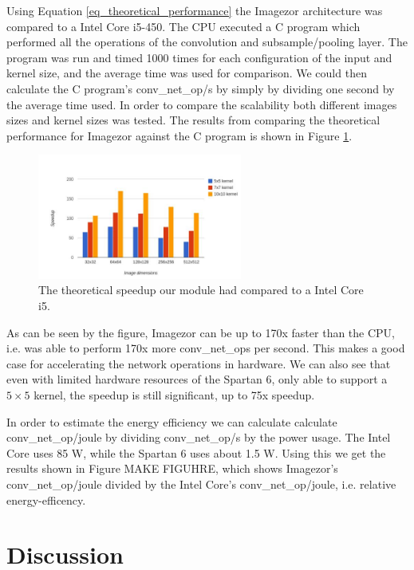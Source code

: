 Using Equation \ref{eq_theoretical_performance} the Imagezor architecture was  compared  to a Intel Core i5-450. The CPU executed a C program which performed all the operations of the convolution and subsample/pooling layer. The program was run and timed 1000 times for each configuration of the input and kernel size, and the average time was used for comparison. We could then calculate the C program's conv\_net\_op/s by simply by dividing one second by the average time used.  In order to compare the scalability both different images sizes and kernel sizes was tested. The results from comparing the theoretical performance for Imagezor against the C program is shown in Figure \ref{fig_cpu_cmp_results}.
\begin{figure}
  \centering
      \includegraphics[width=0.6\textwidth]{Figures/Results/Speedup_chart}
  \caption{The theoretical speedup our module had compared to a Intel Core i5.}
  \label{fig_cpu_cmp_results}
\end{figure}

As can be seen by the figure, Imagezor can be up to 170x faster than the CPU, i.e. was able to perform 170x more conv\_net\_ops per second. This makes a good case for accelerating the network operations in hardware. We can also see that even with limited hardware resources of the Spartan 6, only able to support a $ 5 \times 5 $ kernel, the speedup is still significant, up to 75x speedup.


In order to estimate the energy efficiency we can calculate calculate conv\_net\_op/joule by dividing conv\_net\_op/s by the power usage. The Intel Core uses 85 W, while the Spartan 6 uses about 1.5 W. Using this we get the results shown in Figure MAKE FIGUHRE, which shows Imagezor's conv\_net\_op/joule divided by the Intel Core's conv\_net\_op/joule, i.e. relative energy-efficency. 

\section{Discussion}

